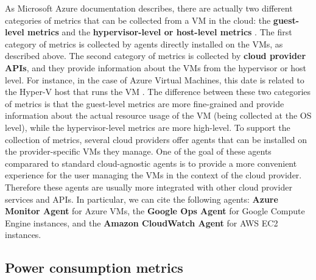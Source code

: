 As Microsoft Azure documentation describes, there are actually two different categories of metrics that can be collected from a VM in the cloud: the \textbf{guest-level metrics} and the \textbf{hypervisor-level or host-level metrics} \cite{azure_vm_monitoring}.
The first category of metrics is collected by agents directly installed on the VMs, as described above.
The second category of metrics is collected by \textbf{cloud provider APIs}, and they provide information about the VMs from the hypervisor or host level.
For instance, in the case of Azure Virtual Machines, this date is related to the Hyper-V host that runs the VM \cite{azure_vm_monitoring}.
The difference between these two categories of metrics is that the guest-level metrics are more fine-grained and provide information about the actual resource usage of the VM (being collected at the OS level), while the hypervisor-level metrics are more high-level. \newline
To support the collection of metrics, several cloud providers offer agents that can be installed on the provider-specific VMs they manage.
One of the goal of these agents comparared to standard cloud-agnostic agents is to provide a more convenient experience for the user managing the VMs in the context of the cloud provider. 
Therefore these agents are usually more integrated with other cloud provider services and APIs.
In particular, we can cite the following agents: \textbf{Azure Monitor Agent} for Azure VMs, the \textbf{Google Ops Agent} for Google Compute Engine instances, and the \textbf{Amazon CloudWatch Agent} for AWS EC2 instances.

\subsection{Power consumption metrics}

